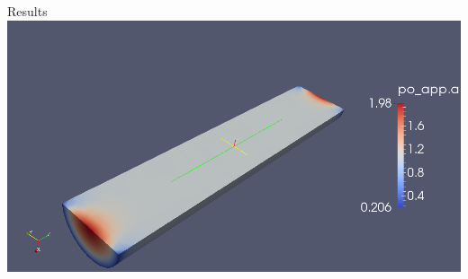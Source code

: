 \documentclass{beamer}
\begin{document}
\begin{frame}{Results}
  \centering
  \includegraphics[scale=0.2]{psi0-clip}
  \begin{figure}[H]
  \end{figure}
\end{frame}
\end{document}
